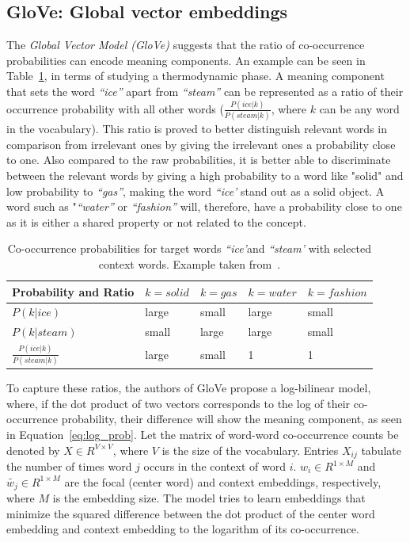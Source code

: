 \subsection{GloVe: Global vector embeddings}
\label{subsec:GloVe}
The \emph{Global Vector Model (GloVe)} suggests that the ratio of co-occurrence probabilities can encode meaning components. An example can be seen in Table~\ref{table:tab_1}, in terms of studying a thermodynamic phase. A meaning component that sets the word \emph{``ice''} apart from \emph{``steam''} can be represented as a ratio of their occurrence probability with all other words \big($\frac { P(ice|k) }{ P(steam|k) } $, where $k$ can be any word in the vocabulary\big). This ratio is proved to better distinguish relevant words in comparison from irrelevant ones by giving the irrelevant ones a probability close to one. Also compared to the raw probabilities, it is better able to discriminate between the relevant words by giving a high probability to a word like "solid" and low probability to \emph{``gas''}, making the word \emph{``ice'} stand out as a solid object. A word such as "\emph{``water''} or \emph{``fashion''} will, therefore, have a probability close to one as it is either a shared property or not related to the concept.\\
\begin{table}[]
\centering

\begin{tabular}{@{}l|l|l|l|l@{}}
\toprule
Probability and Ratio &  $k=solid$& $k=gas$ & $k=water$ &$k= fashion$  \\ \midrule $P(k|ice)$& {\color[HTML]{CB0000}large} &  {\color[HTML]{329A9D}small} & {\color[HTML]{CB0000}large} & {\color[HTML]{329A9D}small} \\\midrule
  $P(k|steam)$&{\color[HTML]{329A9D}small}  & {\color[HTML]{CB0000}large} &  {\color[HTML]{CB0000}large}&{\color[HTML]{329A9D}small}  \\\midrule
 $\frac { P(ice|k) }{ P(steam|k) } $& {\color[HTML]{CB0000}large} &  {\color[HTML]{329A9D}small}&  1 &    1  \\\midrule
\end{tabular}%
\caption{Co-occurrence probabilities for target words \emph{``ice'}and \emph{``steam'} with selected context words. Example taken from~.}
\label{table:tab_1}
\end{table}
\noindent
To capture these ratios, the authors of GloVe propose a log-bilinear model, where, if the dot product of two vectors corresponds to the log of their co-occurrence probability, their difference will show the meaning component, as seen in Equation~\ref{eq:log_prob}. Let the matrix of word-word co-occurrence counts be denoted by $X\in { R }^{ V\times V }$, where $V$ is the size of the vocabulary. Entries $X_{ij}$ tabulate the number of times word $j$ occurs in the context of word $i$. $w_{ i }\in { R }^{ 1\times M }$ and $\tilde{w_{ j }}\in { R }^{ 1\times M }$ are the focal (center word) and context embeddings, respectively, where $M$ is the embedding size. The model tries to learn embeddings that minimize the squared difference between the dot product of the center word embedding and context embedding to the logarithm of its co-occurrence.

